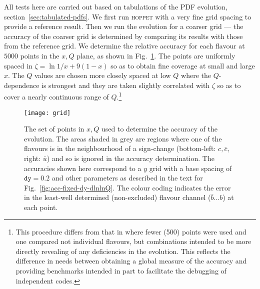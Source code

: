 \documentclass[12pt]{article}
\newcommand{\comment}[1]{{\color{red}\textbf{[#1]}}}
\newcommand{\hoppet}{\textsc{hoppet}\xspace}
\newcommand{\ttt}[1]{\texttt{#1}}
\begin{document}
All tests here are carried out based on tabulations of the PDF
evolution, section~\ref{sec:tabulated-pdfs}.
%
We first run \hoppet with a very fine grid spacing to provide a
reference result. Then we run the evolution for a coarser grid ---
the accuracy of the coarser grid is determined by comparing its
results with those from the reference grid. We determine the relative
accuracy for each flavour at $5000$ points in the $x, Q$ plane, as
shown in Fig.~\ref{fig:grid}. The points are uniformly spaced in
$\zeta = \ln 1/x + 9(1-x)$ so as to obtain fine coverage at small and
large $x$. The $Q$ values are chosen more closely spaced at low $Q$
where the $Q$-dependence is strongest and they are taken slightly correlated
with $\zeta$ so as to cover a nearly continuous range of
$Q$.\footnote{This procedure differs from that in \cite{Giele:2002hx,Dittmar:2005ed}
  where fewer (500) points were used and one compared not individual
  flavours, but combinations intended to be more directly revealing of
  any deficiencies in the evolution. This reflects the difference in
  needs between obtaining a global measure of the accuracy and
  providing benchmarks intended in part to facilitate the debugging of
  independent codes.}


\begin{figure}
  \centering
  \texttt{[image: grid]}%
  \caption{The set of points in $x, Q$ used to determine the accuracy
    of the evolution. The areas shaded in grey are regions where one
    of the flavours is in the neighbourhood of a sign-change
    (bottom-left: $c,\bar c$, right: $\bar u$) and so is ignored in
    the accuracy determination.  The accuracies shown here correspond
    to a $y$ grid with a base spacing of $\ttt{dy}=0.2$ and other
    parameters as described in the text for
    Fig.~\ref{fig:acc-fixed-dy-dlnlnQ}.
    The colour coding indicates the error in the least-well determined
    (non-excluded) flavour channel ($\bar b \ldots b$) at each point.
  }
  \label{fig:grid}
\end{figure}
\end{document}
